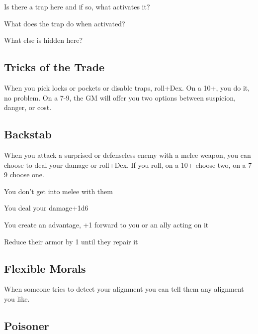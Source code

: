  
\startitemize[1,packed]

\item Is there a trap here and if so, what activates it?

 
\item What does the trap do when activated?

 
\item What else is hidden here?


\stopitemize
 
\subsection{Tricks of the Trade}    
 

When you pick locks or pockets or disable traps, roll+Dex. On a 10+, you do it, no problem. On a 7-9, the GM will offer you two options between suspicion, danger, or cost.

 
\subsection{Backstab}   
 

When you attack a surprised or defenseless enemy with a melee weapon, you can choose to deal your damage or roll+Dex. If you roll, on a 10+ choose two, on a 7-9 choose one.

 
\startitemize[1,packed]

\item You don't get into melee with them

 
\item You deal your damage+1d6

 
\item You create an advantage, +1 forward to you or an ally acting on it

 
\item Reduce their armor by 1 until they repair it


\stopitemize
 
\subsection{Flexible Morals}    
 

When someone tries to detect your alignment you can tell them any alignment you like.

 
\subsection{Poisoner}   
 


